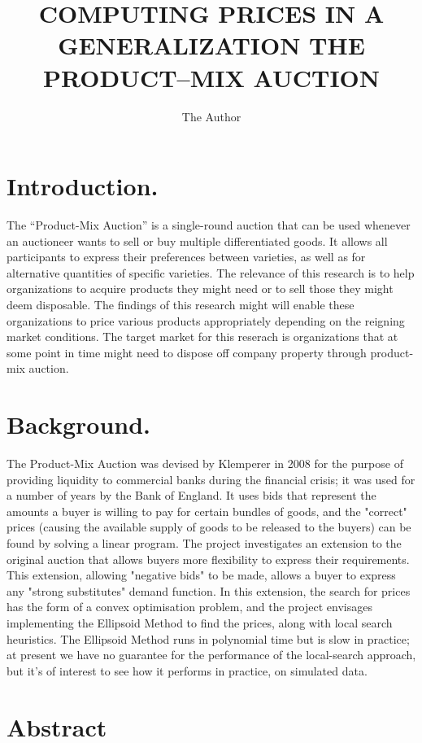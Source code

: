 \documentclass[11pt]{article} %
\title{COMPUTING PRICES IN A GENERALIZATION THE PRODUCT–MIX AUCTION}
\author{The Author}
\begin{document}
\maketitle

\section{Introduction.}

The “Product-Mix Auction” is a single-round auction that can be used whenever an auctioneer wants to sell or buy multiple differentiated goods. It allows all participants to express their preferences between varieties, as well as for alternative quantities of specific varieties.
The relevance of this research is to help organizations to acquire products they might need or to sell those they might deem disposable. The findings of this research might will enable these organizations to price various products appropriately depending on the reigning market conditions. The target market for this reserach is organizations that at some point in time might need to dispose off company property through product-mix auction.

\section{Background.}
The Product-Mix Auction was devised by Klemperer in 2008 for the purpose of providing liquidity to commercial banks during the financial crisis; it was used for a number of years by the Bank of England.
It uses bids that represent the amounts a buyer is willing to pay for certain bundles of goods, and the "correct" prices (causing the available supply of goods to be released to the buyers) can be found by solving a linear program. The project investigates an extension to the original auction that allows buyers more flexibility to express their requirements. This extension, allowing "negative bids" to be made, allows a buyer to express any "strong substitutes" demand function. In this extension, the search for prices has the form of a convex optimisation problem, and the project envisages implementing the Ellipsoid Method to find the prices, along with local search heuristics. The Ellipsoid Method runs in polynomial time but is slow in practice; at present we have no guarantee for the performance of the local-search approach, but it's of interest to see how it performs in practice, on simulated data.

\section{Abstract}
\end{document}

